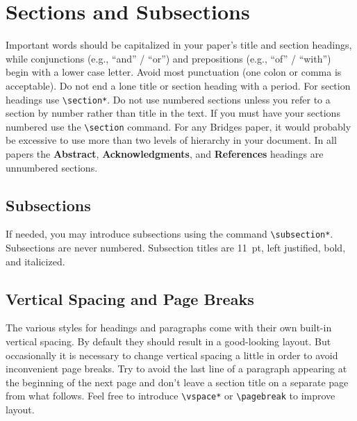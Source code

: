 \documentclass[letterpaper,11pt]{article}
\begin{document}
\section*{Sections and Subsections}

Important words should be capitalized in your paper's title and section
headings, while conjunctions (e.g., ``and'' / ``or'') and prepositions
(e.g., ``of'' / ``with'') begin with a lower case letter. Avoid most punctuation 
(one colon or comma is acceptable). Do not end a lone title or section heading with a period. 
For section headings use \verb|\section*|. Do not use numbered sections
unless you refer to a section by number rather than title in the text. 
If you must have your sections numbered use the \verb|\section| 
command. For any Bridges paper, it would probably be excessive to use 
more than two levels of hierarchy in your document. In all papers the \textbf{Abstract}, 
\textbf{Acknowledgments}, and \textbf{References} headings are unnumbered 
sections.

\subsection*{Subsections}

If needed, you may introduce subsections using the command
\verb|\subsection*|. Subsections are never numbered. Subsection titles 
are 11~pt, left justified, bold, and italicized.

\subsection*{Vertical Spacing and Page Breaks}

The various styles for headings and paragraphs come with their own
built-in vertical spacing. By default they should result in a good-looking layout. 
But occasionally it is necessary to change vertical spacing a little in order to 
avoid inconvenient page breaks. Try to avoid the last line of a paragraph appearing 
at the beginning of the next page and don't leave a section title on a separate page 
from what follows. Feel free to introduce \verb|\vspace*|
or \verb|\pagebreak| to improve layout.
\end{document}
